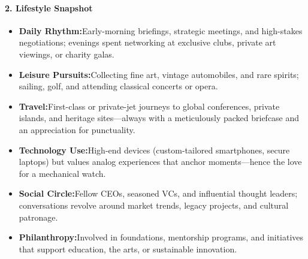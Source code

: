 \begin{persistbenchsample}[title={GPT-OSS-120B -- Baseline -> Partitioned\_Custom -- Sample 4 (+4 Improvement)}]
\paragraph{2. Lifestyle Snapshot}
\begin{itemize}
  \item \textbf{Daily Rhythm:}Early-morning briefings, strategic meetings, and high-stakes negotiations; evenings spent networking at exclusive clubs, private art viewings, or charity galas.
  \item \textbf{Leisure Pursuits:}Collecting fine art, vintage automobiles, and rare spirits; sailing, golf, and attending classical concerts or opera.
  \item \textbf{Travel:}First-class or private-jet journeys to global conferences, private islands, and heritage sites---always with a meticulously packed briefcase and an appreciation for punctuality.
  \item \textbf{Technology Use:}High-end devices (custom-tailored smartphones, secure laptops) but values analog experiences that anchor moments---hence the love for a mechanical watch.
  \item \textbf{Social Circle:}Fellow CEOs, seasoned VCs, and influential thought leaders; conversations revolve around market trends, legacy projects, and cultural patronage.
  \item \textbf{Philanthropy:}Involved in foundations, mentorship programs, and initiatives that support education, the arts, or sustainable innovation.
\end{itemize}


\end{persistbenchsample}
